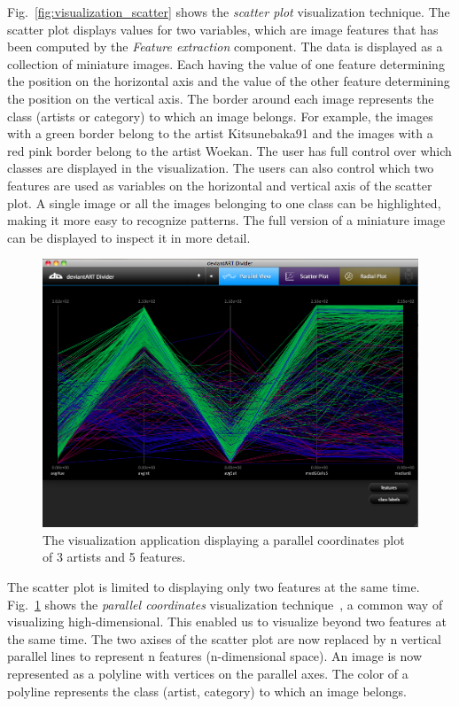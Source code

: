 Fig.~\ref{fig:visualization_scatter} shows the \textit{scatter plot} visualization technique.
The scatter plot displays values for two variables, which are image features that has been computed by the \textit{Feature extraction} component.
The data is displayed as a collection of miniature images.
Each having the value of one feature determining the position on the horizontal axis and the value of the other feature determining the position on the vertical axis.
The border around each image represents the class (artists or category) to which an image belongs.
For example, the images with a green border belong to the artist Kitsunebaka91 and the images with a red pink border belong to the artist Woekan.
The user has full control over which classes are displayed in the visualization.
The users can also control which two features are used as variables on the horizontal and vertical axis of the scatter plot.
A single image or all the images belonging to one class can be highlighted, making it more easy to recognize patterns.
The full version of a miniature image can be displayed to inspect it in more detail.

\begin{figure}[htb]
  \centering
  \includegraphics[width=1\linewidth]{img/visualization_parallel.png}
  \caption{The visualization application displaying a parallel coordinates plot of 3 artists and 5 features.}
  \label{fig:visualization_parallel}
\end{figure}

The scatter plot is limited to displaying only two features at the same time.
Fig.~\ref{fig:visualization_parallel} shows the \textit{parallel coordinates} visualization technique~\cite{andrienko2001constructing}, a common way of visualizing high-dimensional.
This enabled us to visualize beyond two features at the same time.
The two axises of the scatter plot are now replaced by n vertical parallel lines to represent n features (n-dimensional space).
An image is now represented as a polyline with vertices on the parallel axes.
The color of a polyline represents the class (artist, category) to which an image belongs.